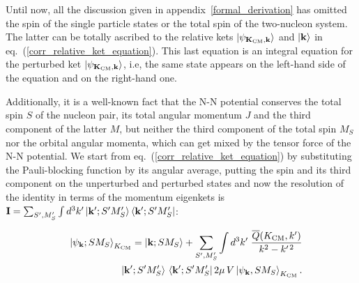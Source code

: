 \documentclass[aps,twocolumn,showpacs,preprintnumbers,amsmath,amssymb,nofootinbib,superscriptaddress,showkeys,noeprint]{revtex4-1}
\newcommand{\nk}{{\bf k}}
\newcommand{\nK}{{\bf K}}
\begin{document}
Until now, all the discussion given in
appendix~\ref{formal_derivation} has omitted the spin of the single
particle states or the total spin of the two-nucleon system. The
latter can be totally ascribed to the relative kets $\left|
\psi_{\nK_{\rm CM},\nk} \right\rangle$ and $\left| \nk \right\rangle$
in eq.~(\ref{corr_relative_ket_equation}).  This last equation is an
integral equation for the perturbed ket $\left| \psi_{\nK_{\rm
    CM},\nk} \right\rangle$, i.e, the same state appears on the
left-hand side of the equation and on the right-hand one.

Additionally, it is a well-known fact that the N-N potential conserves
the total spin $S$ of the nucleon pair, its total angular momentum $J$
and the third component of the latter $M$, but neither the third
component of the total spin $M_S$ nor the orbital angular momenta,
which can get mixed by the tensor force of the N-N potential. We start
from eq.~(\ref{corr_relative_ket_equation}) by substituting the
Pauli-blocking function by its angular average, putting the spin and
its third component on the unperturbed and perturbed states and now
the resolution of the identity in terms of the momentum eigenkets is
$\mathbf{I}=\sum_{S^\prime, M^\prime_S}\int d^3k^\prime
\left|\nk^\prime;S^\prime M^\prime_S\right\rangle \left\langle
\nk^\prime;S^\prime M^\prime_S\right|$:

\begin{eqnarray}
&&\left| \psi_{\nk}; S M_S \right\rangle_{K_{\rm CM}} =
\left| \nk; S M_S \right\rangle + \sum_{S^\prime,M^\prime_S}
 \int d^3k^\prime \;
\frac{\overline{Q}(K_{\rm CM},k^\prime)}{k^2-k^{\prime\,2}}\nonumber\\
&&\left| \nk^\prime;S^\prime M^\prime_S \right\rangle\, 
\left\langle \nk^\prime; S^\prime M^\prime_S \right| 2\mu\, V  
\left| \psi_{\nk}, S M_S \right\rangle_{K_{\rm CM}}.
\label{B-G_equation_relative_ket}
\end{eqnarray}
\end{document}
